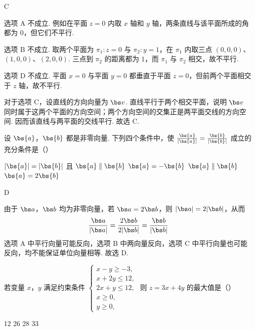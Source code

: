 \begin{answer}
C
\end{answer}

\begin{solution}
选项 A 不成立. 例如在平面 \(z=0\) 内取 \(x\) 轴和 \(y\) 轴，两条直线与该平面所成的角都为 \(0\)，但它们不平行.

选项 B 不成立. 取两个平面为 \(\pi_1:z=0\) 与 \(\pi_2:y=1\)，在 \(\pi_1\) 内取三点 \((0,0,0)\)、\((1,0,0)\)、\((2,0,0)\). 三点到 \(\pi_2\) 的距离都为 \(1\)，而 \(\pi_1\) 与 \(\pi_2\) 相交，故不平行.

选项 D 不成立. 平面 \(x=0\) 与平面 \(y=0\) 都垂直于平面 \(z=0\)，但前两个平面相交于 \(z\) 轴，故不平行.

对于选项 C，设直线的方向向量为 \(\bs v\). 直线平行于两个相交平面，说明 \(\bs v\) 同时属于这两个平面的方向空间；两个方向空间的交集正是两平面交线的方向空间. 因而该直线与两平面的交线平行. 故选 C.
\end{solution}

\begin{problem}
设 \(\bs{a}\)，\(\bs{b}\) 都是非零向量. 下列四个条件中，使 \( \frac{\bs{a}}{|\bs{a}|} = \frac{\bs{b}}{|\bs{b}|} \) 成立的充分条件是（\quad）

\choices
    {\(|\bs{a}| = |\bs{b}|\) 且 \(\bs{a}\parallel\bs{b}\)}
    {\(\bs{a} = -\bs{b}\)}
    {\(\bs{a}\parallel\bs{b}\)}
    {\(\bs{a} = 2\bs{b}\)}
\end{problem}

\begin{answer}
D
\end{answer}

\begin{solution}
由于 \(\bs a\)，\(\bs b\) 均为非零向量，若 \(\bs a=2\bs b\)，则 \(|\bs a|=2|\bs b|\)，从而
\[
\frac{\bs a}{|\bs a|}=\frac{2\bs b}{2|\bs b|}=\frac{\bs b}{|\bs b|}
\]
选项 A 中平行向量可能反向，选项 B 中两向量反向，选项 C 中平行向量也可能反向，均不能保证单位向量相等. 故选 D.
\end{solution}

\begin{problem}
若变量 \(x\)，\(y\) 满足约束条件 \(\begin{cases}
x - y \geqslant -3,\\
x + 2y \leqslant 12,\\
2x + y \leqslant 12,\\
x \geqslant 0,\\
y \geqslant 0,
\end{cases}\) 则 \(z = 3x + 4y\) 的最大值是（\quad）

\choices
    {12}
    {26}
    {28}
    {33}
\end{problem}

